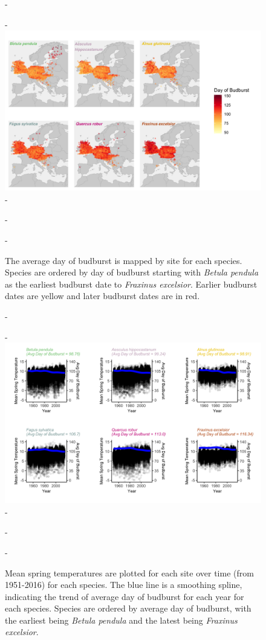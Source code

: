 \documentclass{article}\usepackage[]{graphicx}\usepackage[]{color}
\begin{document}
{\begin{figure} [H]
  -\begin{center}
  -\includegraphics[width=14cm]{..//analyses/figures/BB_base.png}
  -\caption{The average day of budburst is mapped by site for each species. Species are ordered by day of budburst starting with \textit{Betula pendula} as the earliest budburst date to \textit{Fraxinus excelsior}. Earlier budburst dates are yellow and later budburst dates are in red. }\label{fig:bbmap}
  -\end{center}
  -\end{figure}}
  
{\begin{figure} [H]
  -\begin{center}
  -\includegraphics[width=16cm]{..//analyses/figures/MSTBB_bySpp.png}
  -\caption{Mean spring temperatures are plotted for each site over time (from 1951-2016) for each species. The blue line is a smoothing spline, indicating the trend of average day of budburst for each year for each species. Species are ordered by average day of budburst, with the earliest being \textit{Betula pendula} and the latest being \textit{Fraxinus excelsior}. }\label{fig:mst}
  -\end{center}
  -\end{figure}}
  
\end{document}
